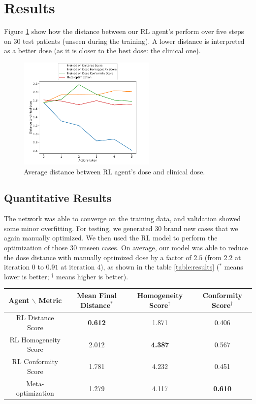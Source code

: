 \section{Results}
Figure \ref{fig:distance} show how the distance between our RL agent's perform over five steps on 30 test patients (unseen during the training).
A lower distance is interpreted as a better dose (as it is closer to the best dose: the clinical one).
\begin{figure}
	\centering
	\includegraphics[width=0.6\textwidth]{DistanceToClinicalDose.pdf}
	\caption{Average distance between RL agent's dose and clinical dose.}
	\label{fig:distance}
\end{figure}


\subsection{Quantitative Results}
The network was able to converge on the training data, and validation showed some minor overfitting.
For testing, we generated 30 brand new cases that we again manually optimized.
We then used the RL model to perform the optimization of those 30 unseen cases.
On average, our model was able to reduce the dose distance with manually optimized dose by a factor of $2.5$ (from $2.2$ at iteration $0$ to $0.91$ at iteration $4$), as shown in the table \ref{table:results} ($^*$ means lower is better; $^\dagger$ means higher is better).

\begin{center}
	\begin{tabular}{| c || c | c | c |} 
		\hline
		Agent $\backslash$ Metric & Mean Final Distance$^*$ & Homogeneity Score$^\dagger$ & Conformity Score$^\dagger$ \\ 
		\hline
		RL Distance Score & \textbf{0.612} & 1.871 & 0.406 \\ 
		RL Homogeneity Score & 2.012 & \textbf{4.387} & 0.567 \\
		RL Conformity Score &  1.781  & 4.232 & 0.451 \\
		Meta-optimization & 1.279 & 4.117 & \textbf{0.610} \\	
		\hline
	\end{tabular}
	\label{table:results}
\end{center}



